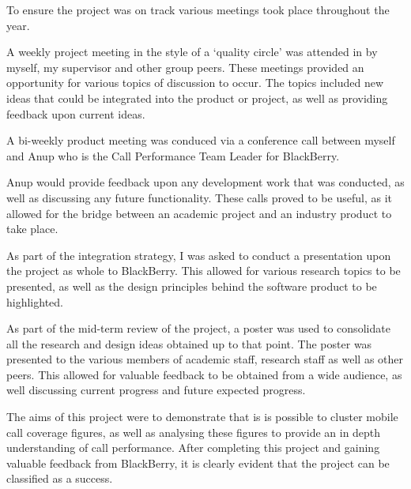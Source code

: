 To ensure the project was on track various meetings took place throughout the 
year. 

A weekly project meeting in the style of a `quality circle' was attended in by 
myself, my supervisor and other group peers. These meetings provided an 
opportunity for various topics of discussion to occur. The topics included new 
ideas that could be integrated into the product or project, as well as 
providing feedback upon current ideas. 

A bi-weekly product meeting was conduced via a conference call between myself 
and Anup who is the Call Performance Team Leader for BlackBerry.

Anup would provide feedback upon any development work that was conducted, as 
well as discussing any future functionality. These calls proved to be useful, 
as it allowed for the bridge between an academic project and an industry 
product to take place.

As part of the integration strategy, I was asked to conduct a presentation upon
the project as whole to BlackBerry. This allowed for various research topics to
be presented, as well as the design principles behind the software product to 
be highlighted. 

As part of the mid-term review of the project, a poster was used to consolidate
all the research and design ideas obtained up to that point. The poster was 
presented to the various members of academic staff, research staff as well as 
other peers. This allowed for valuable feedback to be obtained from a wide 
audience, as well discussing current progress and future expected progress.

The aims of this project were to demonstrate that is is possible to cluster 
mobile call coverage figures, as well as analysing these figures to provide an 
in depth understanding of call performance. After completing this project and 
gaining valuable feedback from BlackBerry, it is clearly evident that the 
project can be classified as a success.
